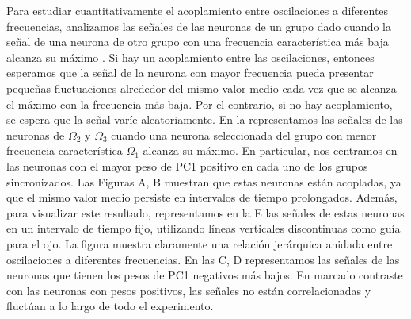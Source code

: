 Para estudiar cuantitativamente el acoplamiento entre oscilaciones a diferentes frecuencias, analizamos las señales de las neuronas de un grupo dado cuando la señal de una neurona de otro grupo con una frecuencia característica más baja alcanza su máximo \cite{jensen_cross-frequency_2007}.   Si hay un acoplamiento entre las oscilaciones, entonces esperamos que la señal de la neurona con mayor frecuencia pueda presentar pequeñas fluctuaciones alrededor del mismo valor medio cada vez que se alcanza el máximo con la frecuencia más baja. Por el contrario, si no hay acoplamiento, se espera que la señal varíe aleatoriamente. En la  representamos las señales de las neuronas de $\Omega_2$ y $\Omega_3$ cuando una neurona seleccionada del grupo con menor frecuencia característica $\Omega_1$ alcanza su máximo. En particular, nos centramos en las neuronas con el mayor peso de PC1 positivo en cada uno de los grupos sincronizados. Las Figuras A, B muestran que estas neuronas están acopladas, ya que el mismo valor medio persiste en intervalos de tiempo prolongados. Además, para visualizar este resultado, representamos en la E las señales de estas neuronas en un intervalo de tiempo fijo, utilizando líneas verticales discontinuas como guía para el ojo. La figura muestra claramente una relación jerárquica anidada entre oscilaciones a diferentes frecuencias. En las C, D representamos las señales de las neuronas que tienen los pesos de PC1 negativos más bajos. En marcado contraste con las neuronas con pesos positivos, las señales no están correlacionadas y fluctúan a lo largo de todo el experimento.


